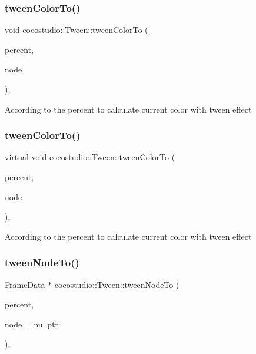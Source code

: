 \subsubsection{\texorpdfstring{tween\+Color\+To()}{tweenColorTo()}\hspace{0.1cm}{\footnotesize\ttfamily [1/2]}}
{\footnotesize\ttfamily void cocostudio\+::\+Tween\+::tween\+Color\+To (\begin{DoxyParamCaption}\item[{float}]{percent,  }\item[{\hyperlink{classcocostudio_1_1FrameData}{Frame\+Data} $\ast$}]{node }\end{DoxyParamCaption})\hspace{0.3cm}{\ttfamily [protected]}, {\ttfamily [virtual]}}

According to the percent to calculate current color with tween effect \mbox{\label{classcocostudio_1_1Tween_ae0616810461ee586d50caaa315c20a49}} 
\subsubsection{\texorpdfstring{tween\+Color\+To()}{tweenColorTo()}\hspace{0.1cm}{\footnotesize\ttfamily [2/2]}}
{\footnotesize\ttfamily virtual void cocostudio\+::\+Tween\+::tween\+Color\+To (\begin{DoxyParamCaption}\item[{float}]{percent,  }\item[{\hyperlink{classcocostudio_1_1FrameData}{Frame\+Data} $\ast$}]{node }\end{DoxyParamCaption})\hspace{0.3cm}{\ttfamily [protected]}, {\ttfamily [virtual]}}

According to the percent to calculate current color with tween effect \mbox{\label{classcocostudio_1_1Tween_a0b84b5a8c09473f25ec6f3f61041b413}} 
\subsubsection{\texorpdfstring{tween\+Node\+To()}{tweenNodeTo()}\hspace{0.1cm}{\footnotesize\ttfamily [1/2]}}
{\footnotesize\ttfamily \hyperlink{classcocostudio_1_1FrameData}{Frame\+Data} $\ast$ cocostudio\+::\+Tween\+::tween\+Node\+To (\begin{DoxyParamCaption}\item[{float}]{percent,  }\item[{\hyperlink{classcocostudio_1_1FrameData}{Frame\+Data} $\ast$}]{node = {\ttfamily nullptr} }\end{DoxyParamCaption})\hspace{0.3cm}{\ttfamily [protected]}, {\ttfamily [virtual]}}

